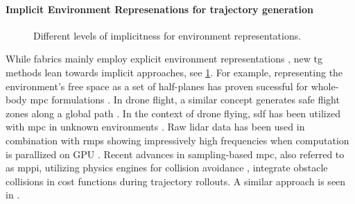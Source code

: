 \paragraph{Implicit Environment Represenations for trajectory generation}

\begin{figure}
  \centering
  
  \caption{Different levels of implicitness for environment representations.}
  \label{fig:ral24_overview}
\end{figure}

While \ac{fabrics} mainly employ explicit environment
representations \cite{Spahn2023,Ratliff2020}, new \ac{tg}
methods lean towards implicit approaches, see \cref{fig:ral24_overview}.
For example, representing the environment's free space as 
a set of half-planes has proven sucessful for whole-body
\ac{mpc} formulations \cite{Spahn2021}.
In drone flight, a similar
concept generates safe flight zones along a global path
\cite{Liu2017a,Tordesillas2019a}. In the context of drone
flying, \ac{sdf} has been utilized with \ac{mpc} in unknown
environments \cite{Oleynikova2017voxblox}. Raw lidar data
has been used in combination with \acp{rmp} showing
impressively high frequencies when computation is parallized
on GPU \cite{Pantic2023obstacle}. Recent advances in
sampling-based \ac{mpc}, also referred to as \ac{mppi}, utilizing physics engines for
collision avoidance \cite{Pezzato2023sampling}, integrate
obstacle collisions in cost functions during trajectory
rollouts. A similar approach is seen in
\cite{Sundaralingam2023curobo}.

